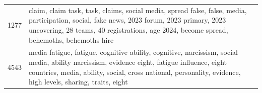 \begin{tabular}{rl}
1277 & claim, claim task, task, claims, social media, spread false, false, media, participation, social, fake news, 2023 forum, 2023 primary, 2023 uncovering, 28 teams, 40 registrations, age 2024, become spread, behemoths, behemoths hire \\
4543 & media fatigue, fatigue, cognitive ability, cognitive, narcissism, social media, ability narcissism, evidence eight, fatigue influence, eight countries, media, ability, social, cross national, personality, evidence, high levels, sharing, traits, eight \\
\bottomrule
\end{tabular}
